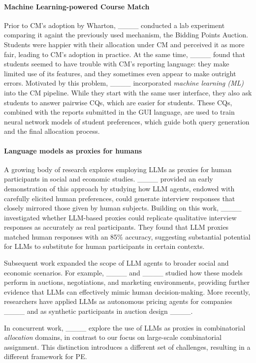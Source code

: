 \paragraph{Machine Learning-powered Course Match}
Prior to CM's adoption by Wharton, ____ conducted a lab experiment comparing it againt the previously used mechanism, the Bidding Points Auction. Students were happier with their allocation under CM and perceived it as more fair, leading to CM's adoption in practice.
At the same time, ____ found that students seemed to have trouble with CM's reporting language: 
they make limited use of its features, 
and they sometimes even appear to make outright errors.
Motivated by this problem, ____ incorporated \textit{machine learning (ML)} into the CM pipeline.
While they start with the same user interface, they also ask students to answer pairwise CQs, which are easier for students. 
These CQs, combined with the reports submitted in the GUI language, are used to train neural network models of student preferences, which guide both query generation and the final allocation process.

\paragraph{Language models as proxies for humans}
A growing body of research explores employing LLMs as proxies for human participants in social and economic studies. 
____ provided an early demonstration of this approach by studying how LLM agents, endowed with carefully elicited human preferences, could generate interview responses that closely mirrored those given by human subjects. Building on this work, ____ investigated whether LLM-based proxies could replicate qualitative interview responses as accurately as real participants. They found that LLM proxies matched human responses with an 85\% accuracy, suggesting substantial potential for LLMs to substitute for
human participants in certain contexts.

Subsequent work expanded the scope of LLM agents to broader social and economic scenarios. For example, ____ and ____ studied how these models perform in auctions, negotiations, and marketing environments, providing further evidence that LLMs can effectively mimic human decision-making. More recently, researchers have applied LLMs as autonomous pricing agents for companies ____ and as synthetic participants in auction design ____.



In concurrent work, ____ explore the use of LLMs as proxies in combinatorial \textit{allocation} domains, in contrast to our focus on large-scale combinatorial assignment. This distinction introduces a different set of challenges, resulting in a different framework for PE.

